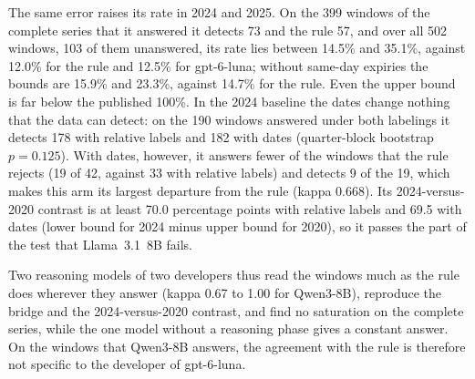 The same error raises its rate in 2024 and 2025. On the 399 windows of the complete series that it answered it detects 73 and the rule 57, and over all 502 windows, 103 of them unanswered, its rate lies between 14.5\% and 35.1\%, against 12.0\% for the rule and 12.5\% for gpt-6-luna; without same-day expiries the bounds are 15.9\% and 23.3\%, against 14.7\% for the rule. Even the upper bound is far below the published 100\%. In the 2024 baseline the dates change nothing that the data can detect: on the 190 windows answered under both labelings it detects 178 with relative labels and 182 with dates (quarter-block bootstrap $p=0.125$). With dates, however, it answers fewer of the windows that the rule rejects (19 of 42, against 33 with relative labels) and detects 9 of the 19, which makes this arm its largest departure from the rule (kappa 0.668). Its 2024-versus-2020 contrast is at least 70.0 percentage points with relative labels and 69.5 with dates (lower bound for 2024 minus upper bound for 2020), so it passes the part of the test that Llama~3.1~8B fails.

Two reasoning models of two developers thus read the windows much as the rule does wherever they answer (kappa 0.67 to 1.00 for Qwen3-8B), reproduce the bridge and the 2024-versus-2020 contrast, and find no saturation on the complete series, while the one model without a reasoning phase gives a constant answer. On the windows that Qwen3-8B answers, the agreement with the rule is therefore not specific to the developer of gpt-6-luna.

